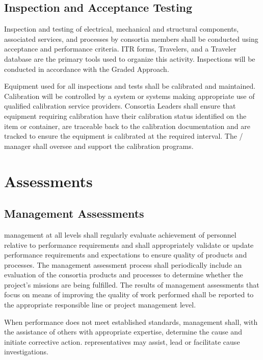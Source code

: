 \subsection{Inspection and Acceptance Testing}

Inspection and testing of electrical, mechanical and structural
components, associated services, and processes by consortia members
shall be conducted using acceptance and performance criteria. ITR
forms, Travelers, and a Traveler database are the primary tools used
to organize this activity. Inspections will be conducted in accordance
with the Graded Approach.

Equipment used for all inspections and tests shall be calibrated and
maintained. Calibration will be controlled by a system or systems
making appropriate use of qualified calibration service
providers. Consortia Leaders shall ensure that equipment requiring
calibration have their calibration status identified on the item or
container, are traceable back to the calibration documentation and are
tracked to ensure the equipment is calibrated at the required
interval. The /  manager shall oversee and
support the  calibration programs.

\section{Assessments}

\subsection{Management Assessments}

 management at all levels shall regularly evaluate achievement of
personnel relative to performance requirements and shall appropriately
validate or update performance requirements and expectations to ensure
quality of products and processes. The management assessment process
shall periodically include an evaluation of the consortia products
and processes to determine whether the project's missions are being
fulfilled. The results of management assessments that focus on means
of improving the quality of work performed shall be reported to the
appropriate responsible line or project management level.

When performance does not meet established standards, management
shall, with the assistance of others with appropriate expertise,
determine the cause and initiate corrective action.  representatives
may assist, lead or facilitate cause investigations.

